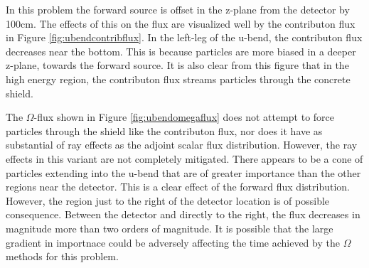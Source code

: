 In this problem the forward source is offset in the z-plane from the detector by
100cm. The effects of this on the flux are visualized well by the contributon
flux in Figure \ref{fig:ubendcontribflux}. In the left-leg of the u-bend, the
contributon flux decreases near the bottom. This is because particles are more
biased in a deeper z-plane, towards the forward source. It is also clear from
this figure that in the high energy region, the contributon flux streams
particles through the concrete shield.

The $\Omega$-flux shown in Figure \ref{fig:ubendomegaflux} does not attempt to
force particles through the shield like the contributon flux, nor does it have
as substantial of ray effects as the adjoint scalar flux distribution. However,
the ray effects in this variant are not completely mitigated. There appears to
be a cone of particles extending into the u-bend that are of greater importance
than the other regions near the detector. This is a clear effect of the forward
flux distribution. However, the region just to the right of the detector
location is of possible consequence. Between the detector and directly to the
right, the flux decreases in magnitude more than two orders of magnitude. It is
possible that the large gradient in importnace could be adversely affecting the
time achieved by the $\Omega$ methods for this problem.

